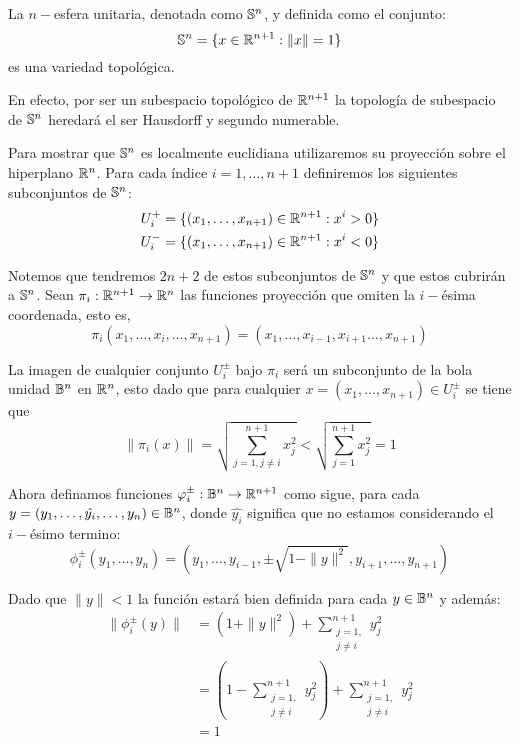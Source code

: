 \begin{example}[$n-$Esfera]\label{Ex: Variedad Topologica - Esfera}
	La $n-$esfera unitaria, denotada como $\S^n$, y definida como el conjunto:
	\[
		\S^n = \{x \in \R^{n+1}: \| x \| = 1 \}
	\]
	es una variedad topológica.

	En efecto, por ser un subespacio topológico de $\R^{n+1}$ la topología de subespacio de $\S^n$ heredará el ser Hausdorff y segundo numerable.

	Para mostrar que $\S^n$ es localmente euclidiana utilizaremos su proyección sobre el hiperplano $\R^{n}$. Para cada índice $i=1, \hdots, n+1$ definiremos los siguientes subconjuntos de $\S^n$:
	\begin{align*}
		U_{i}^{+} & = \{(x_1,\hdots,x_{n+1}) \in \R^{n+1}: x^i > 0\} \\
		U_{i}^{-} & = \{(x_1,\hdots,x_{n+1}) \in \R^{n+1}: x^i < 0\}
	\end{align*}

	Notemos que tendremos $2n + 2$ de estos subconjuntos de $\S^n$ y que estos cubrirán a $\S^n$. Sean $\pi_i: \R^{n+1} \to \R^n$ las funciones proyección que omiten la $i-$ésima coordenada, esto es,
	\[
		\pi_i(x_1,\hdots,x_i,\hdots,x_{n+1}) = (x_1,\hdots,x_{i-1},x_{i+1}\hdots,x_{n+1})
	\]

	La imagen de cualquier conjunto $U_{i}^{\pm}$ bajo $\pi_i$ será un subconjunto de la bola unidad $\B^n$ en $\R^n$, esto dado que para cualquier $x=(x_1, \hdots, x_{n+1}) \in U_{i}^{\pm}$ se tiene que
	\[
		\|\pi_i(x)\| = \sqrt{\sum_{j=1, j\neq i}^{n+1} x_j^2} < \sqrt{\sum_{j=1}^{n+1} x_j^2} = 1
	\]

	Ahora definamos funciones $\phi_i^{\pm}: \B^n \to \R^{n+1}$ como sigue, para cada $y=(y_1, \dots, \hat{y_i}, \dots, y_n) \in \B^n$, donde $\hat{y_i}$ significa que no estamos considerando el $i-$ésimo termino:
	\[
		\phi_{i}^{\pm}(y_1, \hdots, y_n) =  (y_1, \hdots, y_{i-1}, \pm\sqrt{1 - \|y\|^2}, y_{i+1}, \hdots, y_{n+1})
	\]

	Dado que $\|y\| < 1$ la función estará bien definida para cada $y \in \B^n$ y además:
	\begin{align*}
		\|\phi_i^{\pm}(y)\| & = (1 + \| y \|^{2}) + \sum_{\substack{j=1, \\ j \neq i}}^{n+1} y_j^2 \\
		                    & = \left(
		1 - \sum_{\substack{j=1,                                         \\ j \neq i}}^{n+1} y_j^2
		\right) + \sum_{\substack{j=1,                                   \\ j \neq i}}^{n+1} y_j^2 \\
		                    & = 1
	\end{align*}


\end{example}
